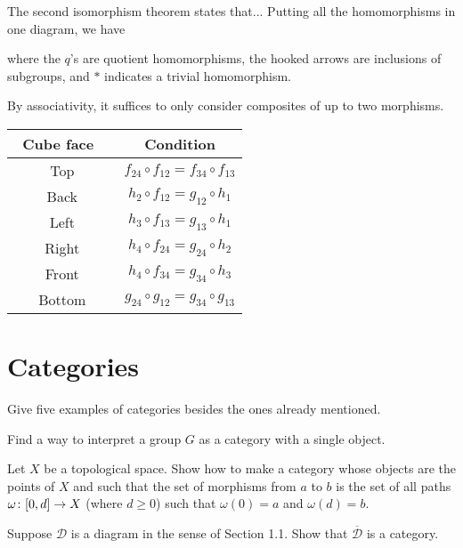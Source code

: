 The second isomorphism theorem states that... Putting all the homomorphisms in one diagram, we have
\bse
{}
\ese
where the $q$'s are quotient homomorphisms, the hooked arrows are inclusions of subgroups, and $*$ indicates a trivial homomorphism.
\item By associativity, it suffices to only consider composites of up to two morphisms.
\begin{table}[h!]
\def\arraystretch{1.25}
\centering
\begin{tabular}{c||c}
\ Cube face\ \ & Condition\\
\hline
\hline
Top & $f_{24}\circ f_{12}=f_{34}\circ f_{13}$ \\
Back & $h_{2}\circ f_{12}=g_{12}\circ h_{1}$\\
Left & $h_{3}\circ f_{13}=g_{13}\circ h_{1}$\\
Right & $h_{4}\circ f_{24}=g_{24}\circ h_{2}$\\
Front & $h_{4}\circ f_{34}=g_{34}\circ h_{3}$\\
Bottom & $g_{24}\circ g_{12}=g_{34}\circ g_{13}$
\end{tabular}
\end{table}
\een
\es

\section{Categories}

\bx
\ben[label=(\alph*)]
\item Give five examples of categories besides the ones already mentioned.
\item Find a way to interpret a group $G$ as a category with a single object.
\item Let $X$ be a topological space. Show how to make a category whose objects are the points of $X$ and such that the set of morphisms from $a$ to $b$ is the set of all paths $\omega \colon [0, d] \to X$ (where $d \geq 0$) such that $\omega(0) = a$ and $\omega(d) = b$.
\item Suppose $\mathcal{D}$ is a diagram in the sense of Section 1.1. Show that $\overline{\mathcal{D}}$ is a category.
\een
\ex

